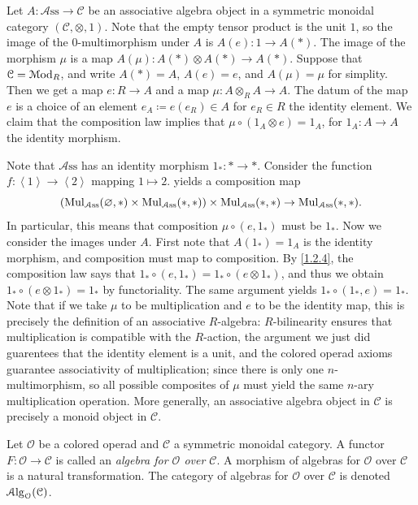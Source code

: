 \begin{discussion}\label{1.2.7}
	Let $A : \mathcal{A} \mathrm{ss}  \to \mathcal{C} $ be an associative algebra object in a symmetric monoidal category $(\mathcal{C} ,\otimes ,1)$. Note that the empty tensor product is the unit $1$, so the image of the 0-multimorphism under $A$ is $A(e): 1 \to A(*)$. The image of the morphism $\mu $ is a map $A(\mu ): A(*)\otimes A(*) \to A(*)$. Suppose that $\mathcal{C} =\mathcal{M}\mathrm{od} _R$, and write $A(*)=A$, $A(e)=e$, and $A(\mu )=\mu $ for simplity. Then we get a map $e : R \to A$ and a map $\mu : A\otimes _RA \to A$. The datum of the map $e$ is a choice of an element $e_A\coloneqq e(e_R)\in A$ for $e_R\in R$ the identity element. We claim that the composition law implies that $\mu \circ (1_A \otimes e) = 1_A$, for $1_A : A \to A$ the identity morphism.

	Note that $\mathcal{A} \mathrm{ss} $ has an identity morphism $1_* : * \to *$. Consider the function $f : \left\langle 1 \right\rangle  \to \left\langle 2 \right\rangle $ mapping $1\mapsto 2$.  yields a composition map
	\[
		\left( \operatorname{Mul}_{\mathcal{A} \mathrm{ss} } (\varnothing,*)\times \operatorname{Mul}_{\mathcal{A} \mathrm{ss} } (*,*) \right) \times \operatorname{Mul}_{\mathcal{A} \mathrm{ss} } (*,*)\to \operatorname{Mul}_{\mathcal{A} \mathrm{ss} } (* ,*)
	.\]
	In particular, this means that composition $\mu \circ (e,1_*)$ must be $1_*$. Now we consider the images under $A$. First note that $A(1_*)=1_A$ is the identity morphism, and composition must map to composition. By \cref{1.2.4}, the composition law says that $1_* \circ (e,1_*) = 1_*\circ (e\otimes 1_*)$, and thus we obtain $1_* \circ (e\otimes 1_*)=1_*$ by functoriality. The same argument yields $1_*\circ (1_*,e)=1_*$. Note that if we take $\mu $ to be multiplication and $e$ to be the identity map, this is precisely the definition of an associative $R$-algebra: $R$-bilinearity ensures that multiplication is compatible with the $R$-action, the argument we just did guarentees that the identity element is a unit, and the colored operad axioms guarantee associativity of multiplication; since there is only one $n$-multimorphism, so all possible composites of $\mu $ must yield the same $n$-ary multiplication operation. More generally, an associative algebra object in $\mathcal{C} $ is precisely a monoid object in $\mathcal{C} $.
\end{discussion}

\begin{definition}\label{1.2.8}
	Let $\mathcal{O} $ be a colored operad and $\mathcal{C} $ a symmetric monoidal category. A functor $F : \mathcal{O}  \to \mathcal{C} $ is called an \emph{algebra for $\mathcal{O} $ over $\mathcal{C} $}. A morphism of algebras for $\mathcal{O} $ over $\mathcal{C} $ is a natural transformation. The category of algebras for $\mathcal{O} $ over $\mathcal{C} $ is denoted $\mathcal{A}\mathrm{lg}_{\mathcal{O} } (\mathcal{C} )$.
\end{definition}

